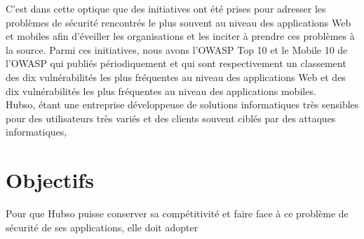 C’est dans cette optique que des initiatives ont été prises pour adresser les problèmes de sécurité rencontrés le plus souvent au niveau des applications Web et mobiles afin d’éveiller les organisations et les inciter à prendre ces problèmes à la source. Parmi ces initiatives, nous avons l’OWASP Top 10 et le Mobile 10 de l’OWASP qui publiés périodiquement et qui sont respectivement un classement des dix vulnérabilités les plus fréquentes au niveau des applications Web et des dix vulnérabilités les plus fréquentes au niveau des applications mobiles.\\
Hubso, étant une entreprise développeuse de solutions informatiques très sensibles pour des utilisateurs très variés et des clients souvent ciblés par des attaques informatiques, 

\section{Objectifs}
Pour que Hubso puisse conserver sa compétitivité et faire face à ce problème de sécurité de ses applications, elle doit adopter 
\clearpage 
